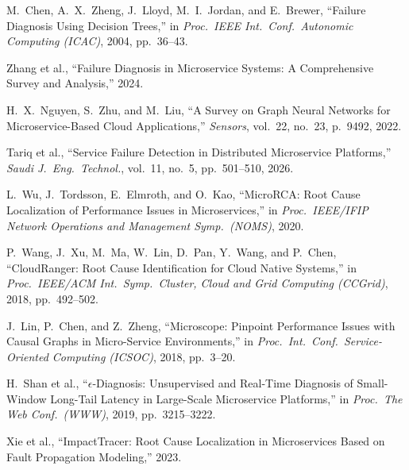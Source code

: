 \documentclass[11pt,a4paper]{article}
\begin{document}
\begin{enumerate}[leftmargin=2em,itemsep=2pt,label={[\arabic*]}]
\footnotesize

  \item M.\ Chen, A.\ X.\ Zheng, J.\ Lloyd, M.\ I.\ Jordan, and E.\ Brewer,
        ``Failure Diagnosis Using Decision Trees,'' in \emph{Proc.\ IEEE Int.\
        Conf.\ Autonomic Computing (ICAC)}, 2004, pp.\ 36--43.

  \item Zhang et al., ``Failure Diagnosis in Microservice Systems: A
        Comprehensive Survey and Analysis,'' 2024.

  \item H.\ X.\ Nguyen, S.\ Zhu, and M.\ Liu, ``A Survey on Graph Neural
        Networks for Microservice-Based Cloud Applications,'' \emph{Sensors},
        vol.\ 22, no.\ 23, p.\ 9492, 2022.

  \item Tariq et al., ``Service Failure Detection in Distributed Microservice
        Platforms,'' \emph{Saudi J.\ Eng.\ Technol.}, vol.\ 11, no.\ 5,
        pp.\ 501--510, 2026.

  \item L.\ Wu, J.\ Tordsson, E.\ Elmroth, and O.\ Kao, ``MicroRCA: Root Cause
        Localization of Performance Issues in Microservices,'' in \emph{Proc.\
        IEEE/IFIP Network Operations and Management Symp.\ (NOMS)}, 2020.

  \item P.\ Wang, J.\ Xu, M.\ Ma, W.\ Lin, D.\ Pan, Y.\ Wang, and P.\ Chen,
        ``CloudRanger: Root Cause Identification for Cloud Native Systems,''
        in \emph{Proc.\ IEEE/ACM Int.\ Symp.\ Cluster, Cloud and Grid Computing
        (CCGrid)}, 2018, pp.\ 492--502.

  \item J.\ Lin, P.\ Chen, and Z.\ Zheng, ``Microscope: Pinpoint Performance
        Issues with Causal Graphs in Micro-Service Environments,'' in
        \emph{Proc.\ Int.\ Conf.\ Service-Oriented Computing (ICSOC)}, 2018,
        pp.\ 3--20.

  \item H.\ Shan et al., ``$\epsilon$-Diagnosis: Unsupervised and Real-Time
        Diagnosis of Small-Window Long-Tail Latency in Large-Scale Microservice
        Platforms,'' in \emph{Proc.\ The Web Conf.\ (WWW)}, 2019,
        pp.\ 3215--3222.

  \item Xie et al., ``ImpactTracer: Root Cause Localization in Microservices
        Based on Fault Propagation Modeling,'' 2023.


\end{enumerate}
\end{document}
